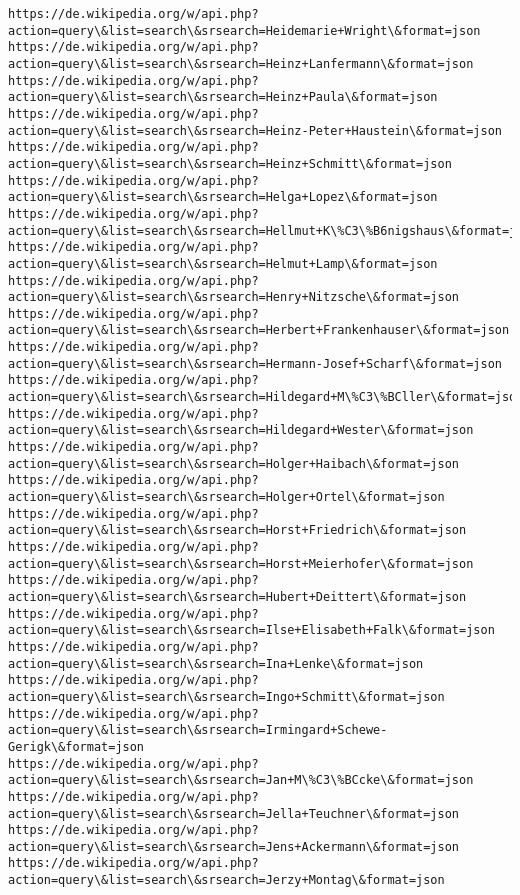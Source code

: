 \documentclass[11pt]{article}
\begin{document}
\begin{Verbatim}[commandchars=\\\{\}]
https://de.wikipedia.org/w/api.php?action=query\&list=search\&srsearch=Heidemarie+Wright\&format=json
https://de.wikipedia.org/w/api.php?action=query\&list=search\&srsearch=Heinz+Lanfermann\&format=json
https://de.wikipedia.org/w/api.php?action=query\&list=search\&srsearch=Heinz+Paula\&format=json
https://de.wikipedia.org/w/api.php?action=query\&list=search\&srsearch=Heinz-Peter+Haustein\&format=json
https://de.wikipedia.org/w/api.php?action=query\&list=search\&srsearch=Heinz+Schmitt\&format=json
https://de.wikipedia.org/w/api.php?action=query\&list=search\&srsearch=Helga+Lopez\&format=json
https://de.wikipedia.org/w/api.php?action=query\&list=search\&srsearch=Hellmut+K\%C3\%B6nigshaus\&format=json
https://de.wikipedia.org/w/api.php?action=query\&list=search\&srsearch=Helmut+Lamp\&format=json
https://de.wikipedia.org/w/api.php?action=query\&list=search\&srsearch=Henry+Nitzsche\&format=json
https://de.wikipedia.org/w/api.php?action=query\&list=search\&srsearch=Herbert+Frankenhauser\&format=json
https://de.wikipedia.org/w/api.php?action=query\&list=search\&srsearch=Hermann-Josef+Scharf\&format=json
https://de.wikipedia.org/w/api.php?action=query\&list=search\&srsearch=Hildegard+M\%C3\%BCller\&format=json
https://de.wikipedia.org/w/api.php?action=query\&list=search\&srsearch=Hildegard+Wester\&format=json
https://de.wikipedia.org/w/api.php?action=query\&list=search\&srsearch=Holger+Haibach\&format=json
https://de.wikipedia.org/w/api.php?action=query\&list=search\&srsearch=Holger+Ortel\&format=json
https://de.wikipedia.org/w/api.php?action=query\&list=search\&srsearch=Horst+Friedrich\&format=json
https://de.wikipedia.org/w/api.php?action=query\&list=search\&srsearch=Horst+Meierhofer\&format=json
https://de.wikipedia.org/w/api.php?action=query\&list=search\&srsearch=Hubert+Deittert\&format=json
https://de.wikipedia.org/w/api.php?action=query\&list=search\&srsearch=Ilse+Elisabeth+Falk\&format=json
https://de.wikipedia.org/w/api.php?action=query\&list=search\&srsearch=Ina+Lenke\&format=json
https://de.wikipedia.org/w/api.php?action=query\&list=search\&srsearch=Ingo+Schmitt\&format=json
https://de.wikipedia.org/w/api.php?action=query\&list=search\&srsearch=Irmingard+Schewe-Gerigk\&format=json
https://de.wikipedia.org/w/api.php?action=query\&list=search\&srsearch=Jan+M\%C3\%BCcke\&format=json
https://de.wikipedia.org/w/api.php?action=query\&list=search\&srsearch=Jella+Teuchner\&format=json
https://de.wikipedia.org/w/api.php?action=query\&list=search\&srsearch=Jens+Ackermann\&format=json
https://de.wikipedia.org/w/api.php?action=query\&list=search\&srsearch=Jerzy+Montag\&format=json

\end{Verbatim}
\end{document}
